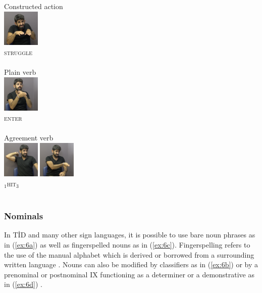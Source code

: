\documentclass[review]{elsarticle} %
\begin{document}
\begin{multicols}{3}
\begin{exe}
\ex
\begin{xlist}
\ex \label{ex:9a} Constructed action \\\glll 
\includegraphics[width=50pt]{pictures/4c.png} \\ \textsc{struggle} \\ \\

\ex \label{ex:9b} Plain verb  \\\glll
\includegraphics[width=50pt]{pictures/4a_2.png}  \\ \textsc{enter}\\ \\

\ex \label{ex:9c} Agreement verb  \\\glll 
\includegraphics[width=50pt]{pictures/4b_1.png} 
\includegraphics[width=50pt]{pictures/4b_2.png} \\ {\textsc{$_{1}$hit$_{3}$}} {} \\ \\ 
\end{xlist}
\end{exe}
\end{multicols}

\hypertarget{nominals}{%
\subsubsection{Nominals}\label{nominals}}

In TİD and many other sign languages, it is possible to use bare noun
phrases as in (\ref{ex:6a}) as well as fingerspelled nouns as in
(\ref{ex:6c}). Fingerspelling refers to the use of the manual alphabet
which is derived or borrowed from a surrounding written language
\citep{kubus2008}. Nouns can also be modified by classifiers as in
(\ref{ex:6b}) \citep{frederiksen2016} or by a prenominal or postnominal
IX functioning as a determiner or a demonstrative as in (\ref{ex:6d})
\citep{maclaughlin1997}.
\end{document}
